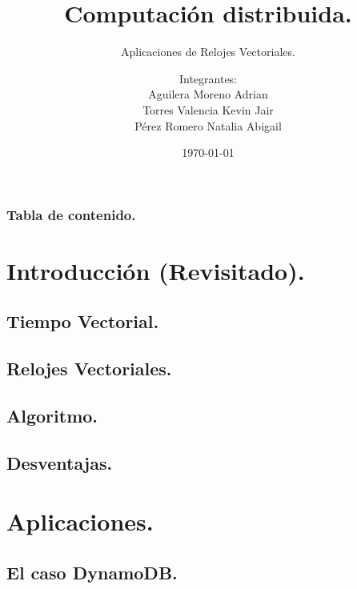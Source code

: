 \documentclass[9pt]{beamer}
\title{Computación distribuida.}
\subtitle{Aplicaciones de Relojes Vectoriales.}
\author{Integrantes:\\
        Aguilera Moreno Adrian\\
        Torres Valencia Kevin Jair\\
        Pérez Romero Natalia Abigail}
\institute{Facultad de Ciencias, UNAM}
\date{\today}
\begin{document}
\titlepage

\begin{frame}
 \frametitle{Tabla de contenido.}
 \tableofcontents
\end{frame}

\section{Introducción (Revisitado).}


\subsection{Tiempo Vectorial.}


\subsection{Relojes Vectoriales.}


\def\beamer@mytheme@style{green}

\subsection{Algoritmo.}

\subsection{Desventajas.}



\section{Aplicaciones.}
\subsection{El caso DynamoDB.}












\end{document}
